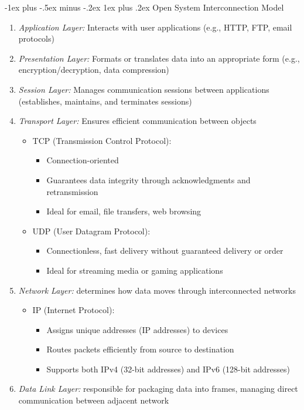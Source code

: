 \documentclass[10pt,landscape]{article}
\makeatletter
\newcommand{\subsubsubsection}{\@startsection{subsubsection}{3}{0mm}%
                                {-1ex plus -.5ex minus -.2ex}%
                                {1ex plus .2ex}%
                                {\normalfont\scriptsize\bfseries}}
\newcommand{\1}{\mathmybb{1}}
\makeatother
\begin{document}
\begin{multicols*}{3}
\subsubsubsection{Open System Interconnection Model}
\begin{enumerate}
  \item \textit{Application Layer:} Interacts with user applications (e.g., HTTP, FTP,
  email protocols)
  \item \textit{Presentation Layer:} Formats or translates data into an appropriate
  form (e.g., encryption/decryption, data compression)
  \item \textit{Session Layer:} Manages communication sessions between
  applications (establishes, maintains, and terminates sessions)
  \item \textit{Transport Layer:} Ensures efficient communication between objects
  \begin{itemize}
    \item TCP (Transmission Control Protocol):
    \begin{itemize}
      \item Connection-oriented
      \item Guarantees data integrity through acknowledgments and retransmission
      \item Ideal for email, file transfers, web browsing
    \end{itemize}
    \item UDP (User Datagram Protocol):
    \begin{itemize}
      \item Connectionless, fast delivery without guaranteed delivery or order
      \item Ideal for streaming media or gaming applications
    \end{itemize}
  \end{itemize}
  \item \textit{Network Layer:} determines how data moves through interconnected networks
  \begin{itemize}
    \item IP (Internet Protocol):
    \begin{itemize}
      \item Assigns unique addresses (IP addresses) to devices
      \item Routes packets efficiently from source to destination
      \item Supports both IPv4 (32-bit addresses) and IPv6 (128-bit addresses)
    \end{itemize}
  \end{itemize}
  \item \textit{Data Link Layer:} responsible for packaging data into frames, managing direct communication between adjacent network

\end{enumerate}
\end{multicols*}
\end{document}
